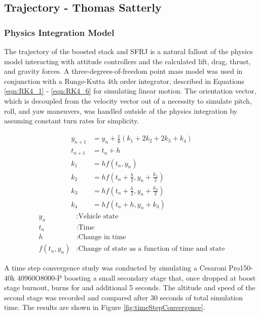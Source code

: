 \subsection{Trajectory - Thomas Satterly}

\subsubsection{Physics Integration Model}
The trajectory of the boosted stack and SFRJ is a natural fallout of the physics model interacting with attitude controllers and the calculated lift, drag, thrust, and gravity forces. A three-degrees-of-freedom point mass model was used in conjunction with a Runge-Kutta 4th order integrator, described in Equations \ref{eqn:RK4_1} - \ref{eqn:RK4_6} for simulating linear motion. The orientation vector, which is decoupled from the velocity vector out of a necessity to simulate pitch, roll, and yaw maneuvers, was handled outside of the physics integration by assuming constant turn rates for simplicity. 

\begin{align}
    y_{n+1} &= y_n + \frac{1}{6}(k_1 + 2k_2 + 2k_3 + k_4) 
    \label{eqn:RK4_1} \\
    t_{n+1} &= t_n + h 
    \label{eqn:RK4_2}\\
    k_1 &= hf(t_n, y_n) 
    \label{eqn:RK4_3}\\
    k_2 &= hf(t_n + \frac{h}{2}, y_n + \frac{k_1}{2}) 
    \label{eqn:RK4_4}\\
    k_3 &= hf(t_n + \frac{h}{2}, y_n + \frac{k_2}{2}) 
    \label{eqn:RK4_5}\\
    k_4 &= hf(t_n + h, y_n + k_3)
    \label{eqn:RK4_6}
\end{align}
\begin{align*}
y_n&: \text{Vehicle state}\\
t_n&: \text{Time}\\
h&: \text{Change in time}\\
f(t_n, y_n)&: \text{Change of state as a function of time and state}
\end{align*}

A time step convergence study was conducted by simulating a Cesaroni Pro150-40k 40960O8000-P boosting a small secondary stage that, once dropped at boost stage burnout, burns for and additional 5 seconds. The altitude and speed of the second stage was recorded and compared after 30 seconds of total simulation time. The results are shown in Figure \ref{fig:timeStepConvergence}.

